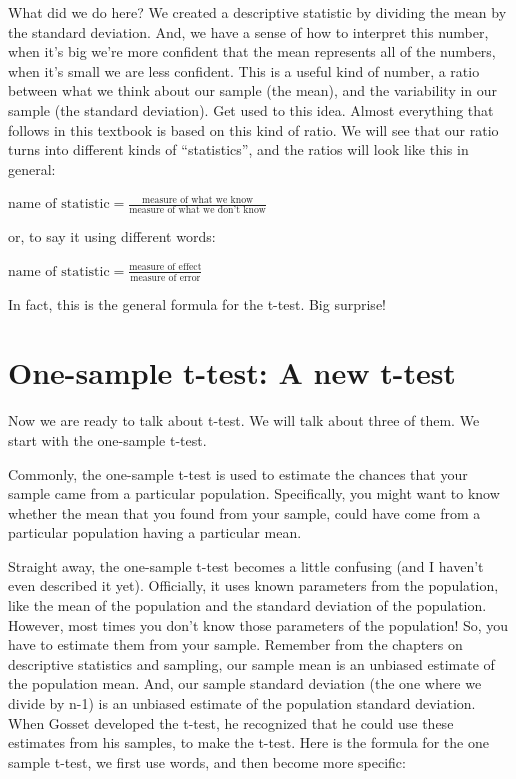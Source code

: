 \documentclass[
  letterpaper,
  DIV=11,
  numbers=noendperiod]{scrreprt}
\begin{document}
What did we do here? We created a descriptive statistic by dividing the
mean by the standard deviation. And, we have a sense of how to interpret
this number, when it's big we're more confident that the mean represents
all of the numbers, when it's small we are less confident. This is a
useful kind of number, a ratio between what we think about our sample
(the mean), and the variability in our sample (the standard deviation).
Get used to this idea. Almost everything that follows in this textbook
is based on this kind of ratio. We will see that our ratio turns into
different kinds of ``statistics'', and the ratios will look like this in
general:

\(\text{name of statistic} = \frac{\text{measure of what we know}}{\text{measure of what we don't know}}\)

or, to say it using different words:

\(\text{name of statistic} = \frac{\text{measure of effect}}{\text{measure of error}}\)

In fact, this is the general formula for the t-test. Big surprise!

\section{One-sample t-test: A new
t-test}\label{one-sample-t-test-a-new-t-test}

Now we are ready to talk about t-test. We will talk about three of them.
We start with the one-sample t-test.

Commonly, the one-sample t-test is used to estimate the chances that
your sample came from a particular population. Specifically, you might
want to know whether the mean that you found from your sample, could
have come from a particular population having a particular mean.

Straight away, the one-sample t-test becomes a little confusing (and I
haven't even described it yet). Officially, it uses known parameters
from the population, like the mean of the population and the standard
deviation of the population. However, most times you don't know those
parameters of the population! So, you have to estimate them from your
sample. Remember from the chapters on descriptive statistics and
sampling, our sample mean is an unbiased estimate of the population
mean. And, our sample standard deviation (the one where we divide by
n-1) is an unbiased estimate of the population standard deviation. When
Gosset developed the t-test, he recognized that he could use these
estimates from his samples, to make the t-test. Here is the formula for
the one sample t-test, we first use words, and then become more
specific:
\end{document}
